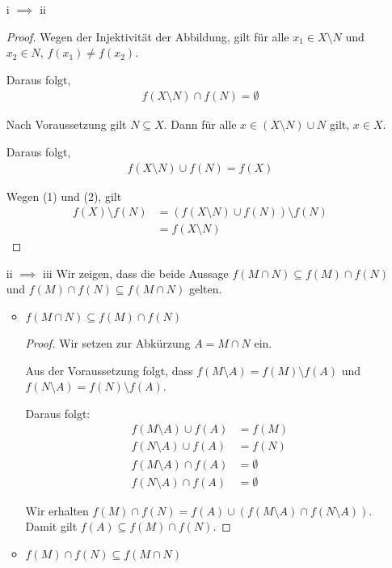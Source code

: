 \documentclass[12pt]{extarticle}
\begin{document}
\begin{itemize}
\item[i \(\implies\) ii]
  \begin{proof}
    Wegen der Injektivität der Abbildung, gilt für alle $x_1 \in X
    \setminus N$ und \(x_2 \in N\), \(f(x_1) \neq f(x_2)\).

    Daraus folgt,
\begin{align*}
f(X \setminus N) \cap f(N) = \emptyset \tag{1}
\end{align*}

Nach Voraussetzung gilt \(N \subseteq X\). Dann für alle
\(x \in (X \setminus N) \cup N\) gilt, \(x \in X\).

Daraus folgt,
\begin{align*}
f(X \setminus N) \cup f(N) = f(X) \tag{2}
\end{align*}

Wegen (1) und (2), gilt
\begin{align*}
f(X) \setminus f(N)   &= (f(X \setminus N) \cup f(N)) \setminus f(N)
                                                \tag*{Wegen (2)}\\
&=  f(X \setminus N)  \tag*{Wegen (1)}
\end{align*}
    \end{proof}
\item[ii \(\implies\) iii]
Wir zeigen, dass die beide Aussage $f(M\cap N) \subseteq f(M) \cap
f(N)$ und \(f(M) \cap f(N) \subseteq f(M \cap N)\) gelten.

\begin{itemize}
\item \(f(M\cap N) \subseteq f(M) \cap f(N)\)
  \begin{proof}
    Wir setzen zur Abkürzung \(A=M \cap N\) ein.

    Aus der Voraussetzung folgt, dass $f(M \setminus A)=f(M) \setminus
    f(A)$ und \(f(N \setminus A)=f(N) \setminus f(A)\).

    Daraus folgt:
\begin{align*}
       f(M \setminus A) \cup f(A) &= f(M)\\
       f(N \setminus A) \cup f(A) &= f(N)\\
       f(M \setminus A) \cap f(A) &= \emptyset\\
       f(N \setminus A) \cap f(A) &= \emptyset
\end{align*}

Wir erhalten $f(M) \cap f(N) = f(A) \cup (f(M \setminus A) \cap f(N
\setminus A))$.  Damit gilt \(f(A) \subseteq f(M) \cap f(N)\).
    \end{proof}
\item \(f(M) \cap f(N) \subseteq f(M \cap N)\)


\end{itemize}
\end{itemize}
\end{document}
